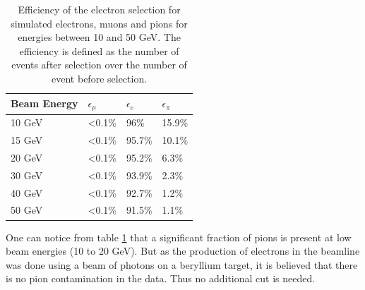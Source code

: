 \begin{table}[htb!]
	\centering
	\caption{Efficiency of the electron selection for simulated electrons, muons and pions for energies between 10 and 50 GeV. The efficiency is defined as the number of events after selection over the number of event before selection.}
	\label{table:eff_electron}
	\begin{tabular}{@{} llll @{}}
		\toprule
		\textbf{Beam Energy} & \textbf{$\epsilon_{\mu}$} & \textbf{$\epsilon_{e}$} & \textbf{$\epsilon_{\pi}$}\\
		\midrule
		10 GeV & <0.1\% & 96\% & 15.9\%\\
		15 GeV & <0.1\% & 95.7\% & 10.1\%\\
		20 GeV & <0.1\% & 95.2\% & 6.3\%\\
		30 GeV & <0.1\% & 93.9\% & 2.3\%\\
		40 GeV & <0.1\% & 92.7\% & 1.2\%\\
		50 GeV & <0.1\% & 91.5\% & 1.1\%\\
		\bottomrule
	\end{tabular}
\end{table}

One can notice from table \ref{table:eff_electron} that a significant fraction of pions is present at low beam energies (10 to 20 GeV). But as the production of electrons in the beamline was done using a beam of photons on a beryllium target, it is believed that there is no pion contamination in the data. Thus no additional cut is needed.

